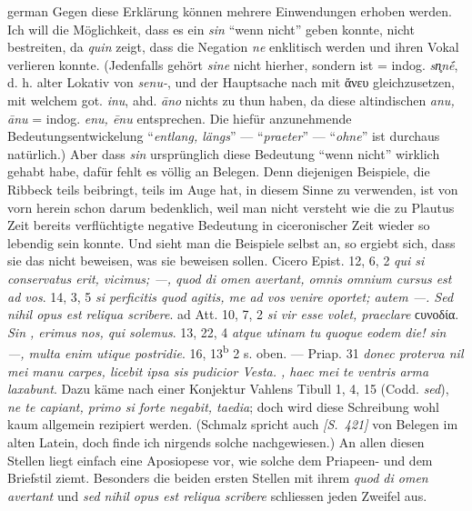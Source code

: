 \begin{otherlanguage*}{german}
Gegen diese Erklärung können mehrere Einwendungen erhoben werden. Ich will die Möglichkeit, dass es ein \emph{sin} “wenn nicht” geben konnte, nicht bestreiten, da \emph{quin} zeigt, dass die Negation \emph{ne} enklitisch werden und ihren Vokal verlieren konnte. (Jedenfalls gehört \emph{sine} nicht hierher, sondern ist = indog. \emph{sn̥nḗ}, d. h. alter Lokativ von\emph{ senu-}, und der Hauptsache nach mit ἄνευ gleichzusetzen, mit welchem got. \emph{inu}, ahd. \emph{āno} nichts zu thun haben, da diese altindischen \emph{anu, ānu} = indog. \emph{enu, ēnu} entsprechen. Die hiefür anzunehmende Bedeutungsentwickelung “\emph{entlang, längs}” — “\emph{praeter}” — “\emph{ohne}” ist durchaus natürlich.) Aber dass \emph{sin} ursprünglich diese Bedeutung “wenn nicht” wirklich gehabt habe, dafür fehlt es völlig an Belegen. Denn diejenigen Beispiele, die Ribbeck teils beibringt, teils im Auge hat, in diesem Sinne zu verwenden, ist von vorn herein schon darum bedenklich, weil man nicht versteht wie die zu Plautus Zeit bereits verflüchtigte negative Bedeutung in ciceronischer Zeit wieder so lebendig sein konnte. Und sieht man die Beispiele selbst an, so ergiebt sich, dass sie das nicht beweisen, was sie beweisen sollen. Cicero Epist. 12, 6, 2 \emph{qui si conservatus erit, vicimus;  —, quod di omen avertant, omnis omnium cursus est ad vos}. 14, 3, 5 \emph{si perficitis quod agitis, me ad vos venire oportet;  autem —. Sed nihil opus est reliqua scribere}. ad Att. 10, 7, 2 \emph{si vir esse volet, praeclare} ϲυνοδία. \emph{Sin , erimus nos, qui solemus}. 13, 22, 4 \emph{atque utinam tu quoque eodem die! sin  —, multa enim utique postridie}. 16, 13\textsuperscript{b} 2 s. oben. — Priap. 31 \emph{donec proterva nil mei manu carpes, licebit ipsa sis pudicior Vesta. , haec mei te ventris arma laxabunt}. Dazu käme nach einer Konjektur Vahlens Tibull 1, 4, 15 \emph{} (Codd. \emph{sed}), \emph{ne te capiant, primo si forte negabit, taedia}; doch wird diese Schreibung wohl kaum allgemein rezipiert werden. (Schmalz spricht auch \hypertarget{p421}{\emph{[S.~421]}}\label{p421} von Belegen im alten Latein, doch finde ich nirgends solche nachgewiesen.) An allen diesen Stellen liegt einfach eine Aposiopese vor, wie solche dem Priapeen- und dem Briefstil ziemt. Besonders die beiden ersten Stellen mit ihrem \emph{quod di omen avertant} und \emph{sed nihil opus est reliqua scribere} schliessen jeden Zweifel aus.


\end{otherlanguage*}
